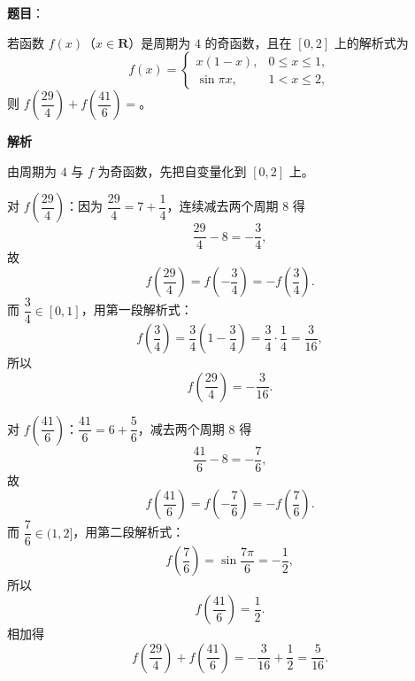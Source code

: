 \begin{answer}

\textbf{题目}：

若函数 $f(x)$（$x\in\mathbf R$）是周期为 $4$ 的奇函数，且在 $[0,2]$ 上的解析式为
\nopagebreak[4]
\[f(x)=\begin{cases}x(1-x),&0\leqslant x\leqslant1,\\\sin\pi x,&1<x\leqslant2,\end{cases}\]
则 $f\left(\dfrac{29}4\right)+f\left(\dfrac{41}6\right)=$\gkblank{}。

\textbf{解析}

由周期为 $4$ 与 $f$ 为奇函数，先把自变量化到 $[0,2]$ 上。

对 $f\left(\dfrac{29}4\right)$：因为 $\dfrac{29}4=7+\dfrac14$，连续减去两个周期 $8$ 得
\nopagebreak[4]
\[\frac{29}4-8=-\frac34,\]
故
\nopagebreak[4]
\[f\left(\frac{29}4\right)=f\left(-\frac34\right)=-f\left(\frac34\right).\]
而 $\dfrac34\in[0,1]$，用第一段解析式：
\nopagebreak[4]
\[f\left(\frac34\right)=\frac34\left(1-\frac34\right)=\frac34\cdot\frac14=\frac3{16},\]
所以
\nopagebreak[4]
\[f\left(\frac{29}4\right)=-\frac3{16}.\]

对 $f\left(\dfrac{41}6\right)$：$\dfrac{41}6=6+\dfrac56$，减去两个周期 $8$ 得
\nopagebreak[4]
\[\frac{41}6-8=-\frac76,\]
故
\nopagebreak[4]
\[f\left(\frac{41}6\right)=f\left(-\frac76\right)=-f\left(\frac76\right).\]
而 $\dfrac76\in(1,2]$，用第二段解析式：
\nopagebreak[4]
\[f\left(\frac76\right)=\sin\frac{7\pi}6=-\frac12,\]
所以
\nopagebreak[4]
\[f\left(\frac{41}6\right)=\frac12 .\]
相加得
\nopagebreak[4]
\[f\left(\frac{29}4\right)+f\left(\frac{41}6\right)=-\frac3{16}+\frac12=\frac5{16}.\]


\end{answer}
